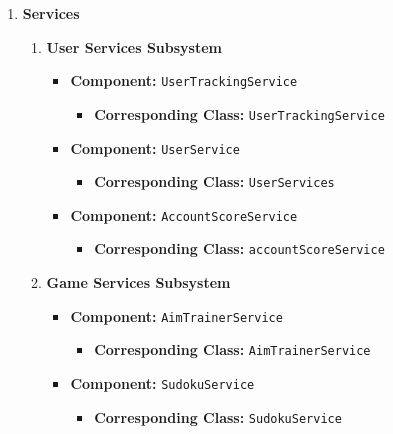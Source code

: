 \documentclass[11pt,a4paper]{article}
\begin{document}
\begin{enumerate}[label=\textbf{\arabic*.}, ref=\arabic*]
    \item \textbf{Services}
        \begin{enumerate}[label=\textbf{\alph*.}, ref=\theenumi.\alph*]
            \item \textbf{User Services Subsystem}
                \begin{itemize}
                    \item \textbf{Component:} \texttt{UserTrackingService}
                        \begin{itemize}
                            \item \textbf{Corresponding Class:} \texttt{UserTrackingService}
                        \end{itemize}
                    \item \textbf{Component:} \texttt{UserService}
                        \begin{itemize}
                            \item \textbf{Corresponding Class:} \texttt{UserServices}
                        \end{itemize}
                    \item \textbf{Component:} \texttt{AccountScoreService}
                        \begin{itemize}
                            \item \textbf{Corresponding Class:} \texttt{accountScoreService}
                        \end{itemize}
                \end{itemize}
            \item \textbf{Game Services Subsystem}
                \begin{itemize}
                    \item \textbf{Component:} \texttt{AimTrainerService}
                        \begin{itemize}
                            \item \textbf{Corresponding Class:} \texttt{AimTrainerService}
                        \end{itemize}
                    \item \textbf{Component:} \texttt{SudokuService}
                        \begin{itemize}
                            \item \textbf{Corresponding Class:} \texttt{SudokuService}
                        \end{itemize}

\end{itemize}
\end{enumerate}
\end{enumerate}
\end{document}
